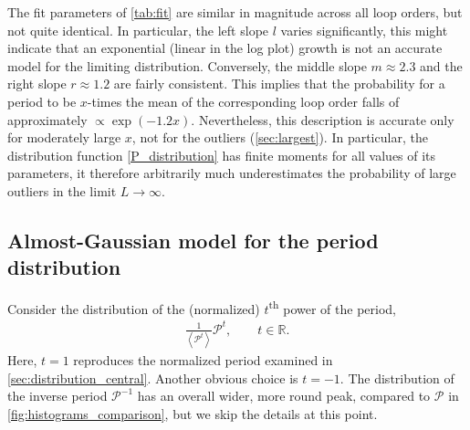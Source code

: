 \documentclass[11pt,a4paper]{article}
\newcommand{\period}{\mathcal P}
\renewcommand{\|}{\rule[-0.4ex]{0.2ex}{1.2em}}
\begin{document}
The fit parameters of \cref{tab:fit} are similar in magnitude across all loop orders, but not quite identical. In particular, the left slope $l$ varies significantly, this might indicate that an exponential (linear in the log plot) growth is not an accurate model for the limiting distribution. Conversely, the middle slope $m \approx 2.3$ and the right slope $r \approx 1.2$ are fairly consistent. This implies that the probability for a period to be $x$-times the mean of the corresponding loop order falls of approximately $\propto \exp(-1.2 x)$. Nevertheless, this description is accurate only for moderately large $x$, not for the outliers (\cref{sec:largest}). In particular, the distribution function \cref{P_distribution} has finite moments for all values of its parameters, it therefore arbitrarily much underestimates the probability of large outliers  in the limit $L\rightarrow \infty$.








\FloatBarrier


\subsection{Almost-Gaussian model for the period distribution} \label{sec:nonlinear}

Consider the distribution of the (normalized) $t$\textsuperscript{th} power of the period, 
\begin{align}\label{period_transformed}
	\frac{1}{\left \langle  \period  ^t \right \rangle  }  \period   ^t, \qquad t\in \mathbb R.
\end{align}
Here, $t=1$ reproduces the normalized period examined in \cref{sec:distribution_central}. Another obvious choice is  $t=-1$. The distribution of  the inverse period $\period^{-1}$  has an overall wider, more round peak, compared to $\period$ in \cref{fig:histograms_comparison}, but we skip the details at this point.
\end{document}
